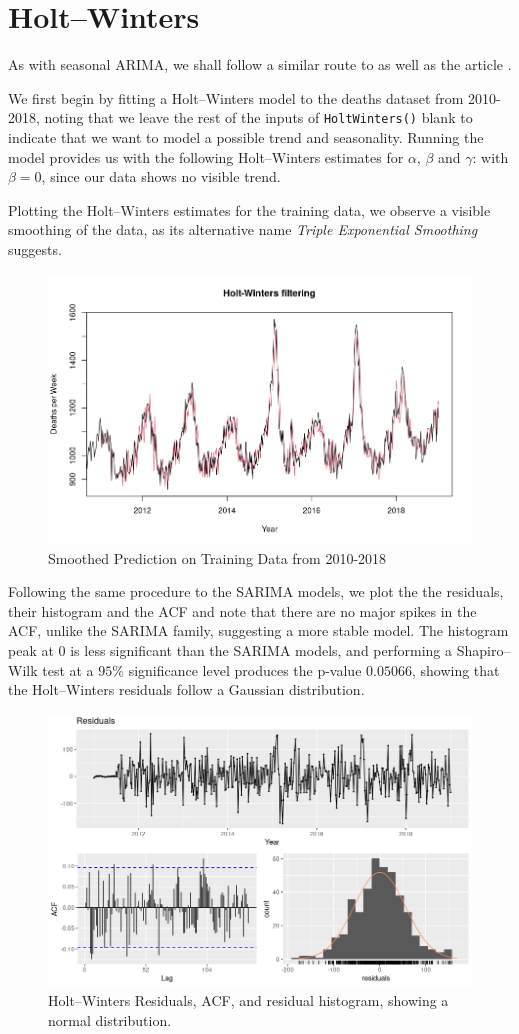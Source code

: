 \documentclass[a4paper, oneside]{discothesis}
\begin{document}
\section{Holt--Winters}
As with seasonal ARIMA, we shall follow a similar route to \cite{itsf} as well as the article \cite{little_ts}.

We first begin by fitting a Holt--Winters model to the deaths dataset from 2010-2018, noting that we leave the rest of the inputs of \texttt{HoltWinters()} blank to indicate that we want to model a possible trend and seasonality. Running the model provides us with the following Holt--Winters estimates for $\alpha$, $\beta$ and $\gamma$:
with $\beta = 0$, since our data shows no visible trend.

Plotting the Holt--Winters estimates for the training data, we observe a visible smoothing of the data, as its alternative name \textit{Triple Exponential Smoothing} suggests.
\begin{figure}[H]
\centering
\includegraphics[width=.77\textwidth]{figures/hw_smoothed.png}
\caption{Smoothed Prediction on Training Data from 2010-2018}
\end{figure}
Following the same procedure to the SARIMA models, we plot the the residuals, their histogram and the ACF and note that there are no major spikes in the ACF, unlike the SARIMA family, suggesting a more stable model. The histogram peak at $0$ is less significant than the SARIMA models, and performing a Shapiro--Wilk test at a $95\%$ significance level produces the p-value $0.05066$, showing that the Holt--Winters residuals follow a Gaussian distribution.
\begin{figure}[H]
\centering
\includegraphics[width=.77\textwidth]{figures/hw_resid_acf.png}
\caption{Holt--Winters Residuals, ACF, and residual histogram, showing a normal distribution.}
\end{figure}
\end{document}
